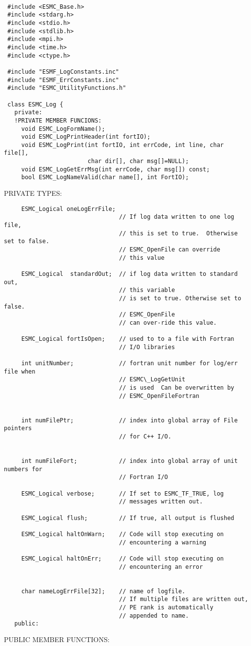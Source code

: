 \begin{verbatim} 
 
 #include <ESMC_Base.h>
 #include <stdarg.h>
 #include <stdio.h>
 #include <stdlib.h>
 #include <mpi.h>
 #include <time.h>
 #include <ctype.h>
 
 #include "ESMF_LogConstants.inc"
 #include "ESMF_ErrConstants.inc"
 #include "ESMC_UtilityFunctions.h"
 
 class ESMC_Log {
   private:
   !PRIVATE MEMBER FUNCIONS:
     void ESMC_LogFormName();
     void ESMC_LogPrintHeader(int fortIO);
     void ESMC_LogPrint(int fortIO, int errCode, int line, char file[],
                        char dir[], char msg[]=NULL);
     void ESMC_LogGetErrMsg(int errCode, char msg[]) const;
     bool ESMC_LogNameValid(char name[], int FortIO);\end{verbatim}{\sf PRIVATE TYPES:}
\begin{verbatim} 
     ESMC_Logical oneLogErrFile;
                                 // If log data written to one log file,
                                 // this is set to true.  Otherwise set to false.
                                 // ESMC_OpenFile can override
                                 // this value
 
     ESMC_Logical  standardOut;  // if log data written to standard out,
                                 // this variable
                                 // is set to true. Otherwise set to false.
                                 // ESMC_OpenFile
                                 // can over-ride this value.
 
     ESMC_Logical fortIsOpen;    // used to to a file with Fortran
                                 // I/O libraries 
     
     int unitNumber;             // fortran unit number for log/err file when
                                 // ESMC\_LogGetUnit
                                 // is used  Can be overwritten by
                                 // ESMC_OpenFileFortran
 
 
     int numFilePtr;             // index into global array of File pointers
                                 // for C++ I/O.
 
 
     int numFileFort;            // index into global array of unit numbers for 
                                 // Fortran I/O
 
     ESMC_Logical verbose;       // If set to ESMC_TF_TRUE, log
                                 // messages written out.
 
     ESMC_Logical flush;         // If true, all output is flushed
 
     ESMC_Logical haltOnWarn;    // Code will stop executing on
                                 // encountering a warning
 			    
     ESMC_Logical haltOnErr;     // Code will stop executing on
                                 // encountering an error
 
 
     char nameLogErrFile[32];    // name of logfile.
                                 // If multiple files are written out,
                                 // PE rank is automatically
                                 // appended to name.
   public:\end{verbatim}{\sf PUBLIC MEMBER FUNCTIONS:}
